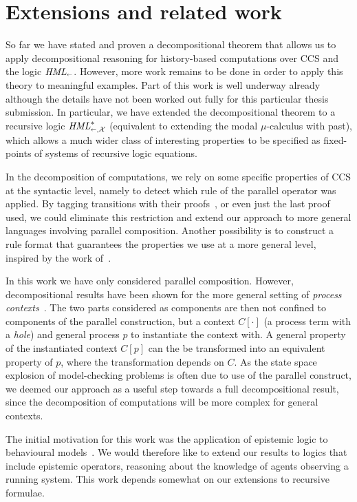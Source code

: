 \section{Extensions and related work} %
\label{sec:decomp_future}

So far we have stated and proven a decompositional theorem that allows us to
apply decompositional reasoning for history-based computations over CCS and
the logic $\textit{HML}_\shortleftarrow$. However, more work remains to be done in order to apply
this theory to meaningful examples. Part of this work is well underway already
although the details have not been worked out fully for this particular thesis
submission. In particular, we have extended the decompositional theorem to a
recursive logic $\textit{HML}_{\shortleftarrow,\mathcal{X}}^*$ (equivalent to extending the modal $\mu$-calculus
with past), which allows a much wider class of interesting 
properties to be specified as fixed-points of systems of recursive logic equations.

In the decomposition of computations, we rely on some specific properties of 
CCS at the syntactic level, namely to detect which rule of the parallel operator
was applied. By tagging transitions with their proofs~\cite{BC88,DeganoP92}, 
or even just the last
proof used, we could eliminate this restriction and extend our approach to more
general languages involving parallel composition. Another possibility is to construct
a rule format that guarantees the properties we use at a more general level, inspired
by the work of~\cite{Fokkink06}.

In this work we have only considered parallel composition. However, decompositional
results have been shown for the more general setting of \emph{process contexts}~\cite{Larsen91}.
The two parts considered as components are then not confined to components
of the parallel construction, but a context $C[\cdot]$ (a process term with a \emph{hole})
and general process $p$ to instantiate the context with. A general property of the
instantiated context $C[p]$ can the be transformed into an equivalent property
of $p$, where the transformation depends on $C$. As the state space explosion
of model-checking problems is often due to use of the parallel construct, we
deemed our approach as a useful step towards a full decompositional result, since
the decomposition of computations will be more complex for general contexts.

The initial motivation for this work was the application of epistemic logic
to behavioural models~\cite{Mousavi07-LPAR}. We would therefore like to extend
our results to logics that include epistemic operators, reasoning about the knowledge
of agents observing a running system. This work depends somewhat on our extensions
to recursive formulae.

